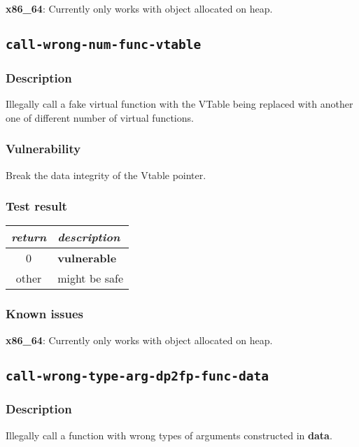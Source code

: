\documentclass[a4paper]{book}
\begin{document}
\textbf{x86\_64}: Currently only works with object allocated on heap.

\newpage
\subsection{\texttt{call-wrong-num-func-vtable}}\label{test-call-wrong-num-func-vtable}

\subsubsection{Description}
Illegally call a fake virtual function with the VTable being replaced with another one of different number of virtual functions.

\subsubsection{Vulnerability}
Break the data integrity of the Vtable pointer.

\subsubsection{Test result}
\begin{tabular}{cl}
  \toprule
  \emph{return}  & \emph{description} \\
  \midrule
  0              & \textbf{vulnerable} \\
  other          & might be safe \\
  \bottomrule
\end{tabular}

\subsubsection{Known issues}

\textbf{x86\_64}: Currently only works with object allocated on heap.

\newpage
\subsection{\texttt{call-wrong-type-arg-dp2fp-func-data}}\label{test-call-wrong-type-arg-dp2fp-func-data}

\subsubsection{Description}
Illegally call a function with wrong types of arguments constructed in \textbf{data}.
\end{document}
